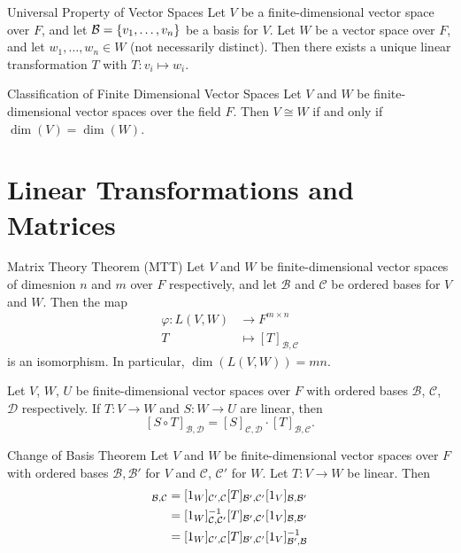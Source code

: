 \documentclass[class=article, crop=false]{standalone}
\begin{document}
  \begin{theorem}{Universal Property of Vector Spaces}
    Let $V$ be a finite-dimensional vector space over $F$, and let $\mathcal{B} = \left\{v_1, \dotsc,v_n\right\}$ be a basis for $V$. Let $W$ be a vector space over $F$, and let $w_1,\dotsc,w_n\in W$ (not necessarily distinct). Then there exists a unique linear transformation $T$ with $T\colon v_i\mapsto w_i$.
  \end{theorem}
  \begin{theorem}{Classification of Finite Dimensional Vector Spaces}
    Let $V$ and $W$ be finite-dimensional vector spaces over the field $F$. Then $V\cong W$ if and only if $\dim(V) = \dim(W)$.
  \end{theorem}
  \section{Linear Transformations and Matrices}
  \begin{theorem}{Matrix Theory Theorem (MTT)}
    Let $V$ and $W$ be finite-dimensional vector spaces of dimesnion $n$ and $m$ over $F$ respectively, and let $\mathcal{B}$ and $\mathcal{C}$ be ordered bases for $V$ and $W$. Then the map
    \begin{align*}
      \varphi\colon L(V, W)&\to F^{m\times n} \\
      T &\mapsto [T]_{\mathcal{B},\mathcal{C}}
    \end{align*}
    is an isomorphism. In particular, $\dim(L(V,W)) = mn$.
  \end{theorem}
  \begin{theorem}{12.2}
    Let $V$, $W$, $U$ be finite-dimensional vector spaces over $F$ with ordered bases $\mathcal{B}$, $\mathcal{C}$, $\mathcal{D}$ respectively. If $T\colon V\to W$ and $S\colon W\to U$ are linear, then
    \[
      [S\circ T]_{\mathcal{B}, \mathcal{D}} = [S]_{\mathcal{C},\mathcal{D}}\cdot [T]_{\mathcal{B},\mathcal{C}}.
    \]
  \end{theorem}
  \begin{theorem}{Change of Basis Theorem}
    Let $V$ and $W$ be finite-dimensional vector spaces over $F$ with ordered bases $\mathcal{B}, \mathcal{B}'$ for $V$ and $\mathcal{C}$, $\mathcal{C}'$ for $W$. Let $T\colon V\to W$ be linear. Then
    \begin{align*}
      [T]_{\mathcal{B},\mathcal{C}} &= [1_W]_{\mathcal{C}',\mathcal{C}}[T]_{\mathcal{B}',\mathcal{C}'}[1_V]_{\mathcal{B},\mathcal{B}'} \\
      &= [1_W]_{\mathcal{C},\mathcal{C}'}\inv[T]_{\mathcal{B}',\mathcal{C}'}[1_V]_{\mathcal{B},\mathcal{B}'} \\
      &= [1_W]_{\mathcal{C}',\mathcal{C}}[T]_{\mathcal{B}',\mathcal{C}'}[1_V]_{\mathcal{B}',\mathcal{B}}\inv
    \end{align*}
  \end{theorem}
\end{document}

